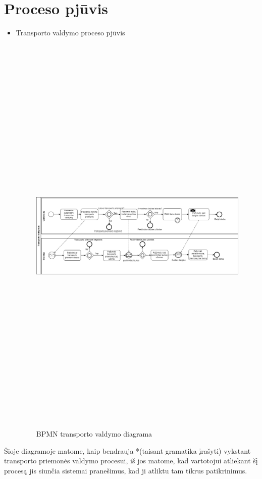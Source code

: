 \documentclass[oneside]{VUMIFPSkursinis}
\begin{document}
	\section{Proceso pjūvis}
	\begin{itemize}
	\item Transporto valdymo proceso pjūvis
	\begin{figure}[H]
		\centering	
	\includegraphics[width=18cm,height=20cm,keepaspectratio]{BPMN_transportoValdymas.png}
	\caption{BPMN transporto valdymo diagrama}
	\label{fig:BPMN_transportoValdymas}
\end{figure}
\end{itemize}
Šioje diagramoje matome, kaip bendrauja *(taisant gramatika įrašyti) vykstant transporto priemonės valdymo procesui, iš jos matome, kad vartotojui atliekant šį procesą jis siunčia sistemai pranešimus, kad ji atliktu tam tikrus patikrinimus.
\end{document}
